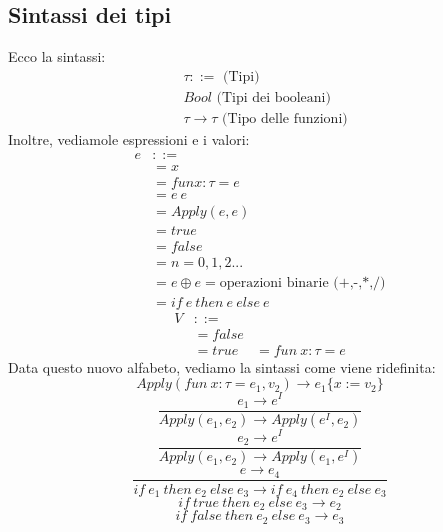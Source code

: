 \documentclass[12pt,a4paper]{article}
\begin{document}
\subsection{Sintassi dei tipi}
Ecco la sintassi:
\[
\begin{aligned}
  &\tau ::= \text{ (Tipi)}\\
  &Bool \text{ (Tipi dei booleani)}\\
  &\tau \rightarrow \tau \text{ (Tipo delle funzioni)}
\end{aligned}
\]
Inoltre, vediamole espressioni e i valori:
\[
\begin{aligned}
  e &::=\\
    &= x\\
    &= fun x: \tau = e\\
    &= e\ e\\
    &= Apply(e,e)\\
    &= true\\
    &= false\\
    & = n = 0,1,2...\\
    & = e \oplus e = \text{operazioni binarie (+,-,*,/)}\\
    &= if\ e\ then\ e\ else\ e
\end{aligned}
\]
\[
\begin{aligned}
  V &::=\\
    &= false\\
    &= true
    &= fun\ x:\tau = e
\end{aligned}
\]
Data questo nuovo alfabeto, vediamo la sintassi come viene ridefinita:
\[
Apply(fun\ x:\tau = e_1,v_2) \rightarrow e_1 \{x:=v_2\}
\]
\[
\frac{e_1 \rightarrow e^I}{Apply(e_1,e_2) \rightarrow Apply(e^I,e_2)}
\]
\[
\frac{e_2 \rightarrow e^I}{Apply(e_1,e_2) \rightarrow Apply(e_1,e^I)}
\]
\[
\frac{e \rightarrow e_4}{if\ e_1\ then\ e_2\ else\ e_3 \rightarrow if\ e_4\ then\ e_2\ else\ e_3}
\]
\[
if\ true\ then\ e_2\ else\ e_3 \rightarrow e_2
\]
\[
if\ false\ then\ e_2\ else\ e_3 \rightarrow e_3
\]
\end{document}

